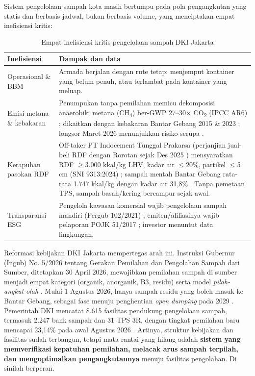 Sistem pengelolaan sampah kota masih bertumpu pada pola pengangkutan yang statis dan berbasis jadwal, bukan berbasis volume, yang menciptakan empat inefisiensi kritis:
\begin{table}[H]
\footnotesize
\renewcommand{\arraystretch}{0.85}
\begin{tabularx}{\textwidth}{|>{\RaggedRight\arraybackslash}p{3.2cm}|>{\RaggedRight\arraybackslash}X|}
\hline
\textbf{Inefisiensi} & \textbf{Dampak dan data} \\
\hline
Operasional \& BBM & Armada berjalan dengan rute tetap: menjemput kontainer yang belum penuh, atau terlambat pada kontainer yang meluap. \\
\hline
Emisi metana \& kebakaran & Penumpukan tanpa pemilahan memicu dekomposisi anaerobik; metana (CH\textsubscript{4}) ber-GWP 27--30$\times$ CO\textsubscript{2} (IPCC AR6) \parencite{ipcc2021}; dikaitkan dengan kebakaran Bantar Gebang 2015 \& 2023 \parencite{bbcindonesia2026}; longsor Maret 2026 menunjukkan risiko serupa \parencite{bbcindonesia2026}. \\
\hline
Kerapuhan pasokan RDF & Off-taker PT Indocement Tunggal Prakarsa (perjanjian jual-beli RDF dengan Rorotan sejak Des 2025 \parencite{tempoindocement2026}) mensyaratkan RDF $\geq$3.000 kkal/kg LHV, kadar air $\leq$20\%, partikel $\leq$5 cm (SNI 9313:2024) \parencite{sni9313}; sampah mentah Bantar Gebang rata-rata \textpm{}1.747 kkal/kg dengan kadar air 31,8\% \parencite{saintek2022}. Tanpa pemetaan TPS, sampah basah/kering bercampur sejak awal. \\
\hline
Transparansi ESG & Pengelola kawasan komersial wajib pengelolaan sampah mandiri (Pergub 102/2021) \parencite{pergub102}; emiten/afiliasinya wajib pelaporan POJK 51/2017 \parencite{pojk51}; investor menuntut data lingkungan. \\
\hline
\end{tabularx}
\caption{Empat inefisiensi kritis pengelolaan sampah DKI Jakarta}
\end{table}

Reformasi kebijakan DKI Jakarta mempertegas arah ini. Instruksi Gubernur (Ingub) No. 5/2026 tentang Gerakan Pemilahan dan Pengolahan Sampah dari Sumber, ditetapkan 30 April 2026, mewajibkan pemilahan sampah di sumber menjadi empat kategori (organik, anorganik, B3, residu) serta model \textit{pilah-angkut-olah} \parencite{ingub5_2026}. Mulai 1 Agustus 2026, hanya sampah residu yang boleh masuk ke Bantar Gebang, sebagai fase menuju penghentian \textit{open dumping} pada 2029 \parencite{ingub5_2026}. Pemerintah DKI mencatat 8.615 fasilitas pendukung pengelolaan sampah, termasuk 2.247 bank sampah dan 31 TPS 3R, dengan tingkat pemilahan baru mencapai \textpm{}23,14\% pada awal Agustus 2026 \parencite{tvrinetwork2026}. Artinya, struktur kebijakan dan fasilitas sudah terbangun, tetapi mata rantai yang hilang adalah \textbf{sistem yang memverifikasi kepatuhan pemilahan, melacak arus sampah terpilah, dan mengoptimalkan pengangkutannya} menuju fasilitas pengolahan. Di sinilah \ProductName{} berperan.


